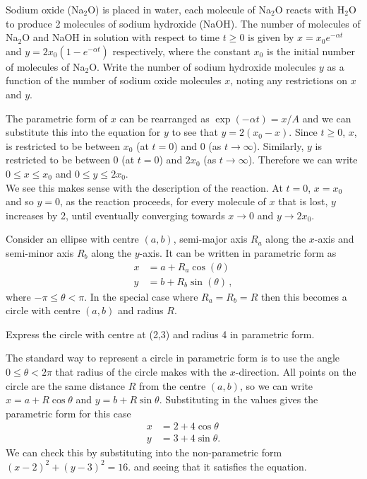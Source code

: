 \begin{example}
    Sodium oxide (Na$_2$O) is placed in water, each molecule of Na$_2$O reacts with H$_2$O to produce 2 molecules of sodium hydroxide (NaOH). The number of molecules of Na$_2$O and NaOH in solution with respect to time $t \geq 0$ is given by $x = x_0e^{-\alpha t}$ and $y = 2x_0(1 - e^{-\alpha t})$ respectively, where the constant $x_0$ is the initial number of molecules of Na$_2$O. Write the number of sodium hydroxide molecules $y$ as a function of the number of sodium oxide molecules $x$, noting any restrictions on $x$ and $y$. 
\end{example}
\begin{solution}
The parametric form of $x$ can be rearranged as $\exp(-\alpha t) = x/A$ and we can substitute this into the equation for $y$ to see that $y = 2(x_0-x)$. Since $t \geq 0$, $x$, is restricted to be between $x_0$ (at $t=0$) and $0$ (as $t \rightarrow \infty$). Similarly, $y$ is restricted to be between $0$ (at $t=0$) and $2x_0$ (as $t \rightarrow \infty$). Therefore we can write $0 \leq x \leq x_0$ and $0 \leq y \leq 2x_0$.\\

We see this makes sense with the description of the reaction. At $t=0$, $x = x_0$ and so $y = 0$, as the reaction proceeds, for every molecule of $x$ that is lost, $y$ increases by 2, until eventually converging towards $x \rightarrow 0$ and $y \rightarrow 2x_0$. 
\end{solution}

Consider an ellipse with centre $(a,b)$, semi-major axis $R_a$ along the $x$-axis and semi-minor axis $R_b$ along the $y$-axis. It can be written in parametric form as
\begin{align*}
x &= a + R_a\cos(\theta) \\
y &= b + R_b\sin(\theta) \, ,
\end{align*}
where $-\pi \leq \theta < \pi$. In the special case where $R_a = R_b = R$ then this becomes a circle with centre $(a,b)$ and radius $R$. 

\begin{example}
\label{eg:parametric_circle}
     Express the circle with centre at (2,3) and radius 4 in parametric form.
\end{example}
\begin{solution}
The standard way to represent a circle in parametric form is to use the angle $0 \leq \theta < 2\pi$ that radius of the circle makes with the $x$-direction. All points on the circle are the same distance $R$ from the centre $(a,b)$, so we can write $x=a+R\cos\theta$ and $y=b+R\sin \theta$. Substituting in the values gives the parametric form for this case 
\begin{align*}
    x&=2+4\cos\theta\\
    y&=3+4\sin\theta.
\end{align*}
We can check this by substituting into the non-parametric form $(x-2)^2+(y-3)^2=16$. and seeing that it satisfies the equation.
\end{solution}

